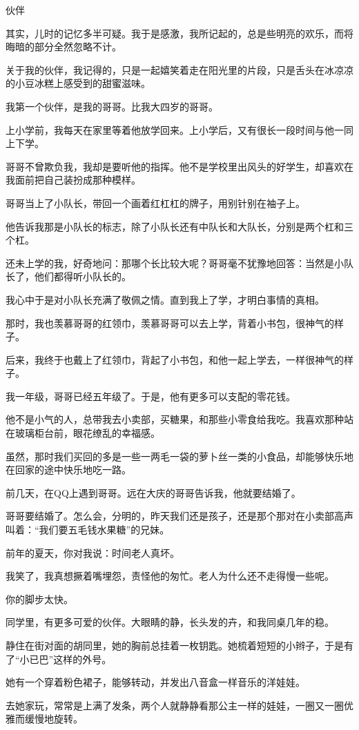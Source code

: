 \documentclass[12pt,a4paper]{article}
\newcommand{\subpart}[1]{
	\begingroup \par
	\vspace{1ex} \centering #1
	\par \endgroup
}
\begin{document}
		\subpart{伙伴}

		其实，儿时的记忆多半可疑。我于是感激，我所记起的，总是些明亮的欢乐，而将晦暗的部分全然忽略不计。\par
		关于我的伙伴，我记得的，只是一起嬉笑着走在阳光里的片段，只是舌头在冰凉凉的小豆冰糕上感受到的甜蜜滋味。

		我第一个伙伴，是我的哥哥。比我大四岁的哥哥。\par
		上小学前，我每天在家里等着他放学回来。上小学后，又有很长一段时间与他一同上下学。\par
		哥哥不曾欺负我，我却是要听他的指挥。他不是学校里出风头的好学生，却喜欢在我面前把自己装扮成那种模样。\par
		哥哥当上了小队长，带回一个画着红杠杠的牌子，用别针别在袖子上。\par
		他告诉我那是小队长的标志，除了小队长还有中队长和大队长，分别是两个杠和三个杠。\par
		还未上学的我，好奇地问：那哪个长比较大呢？哥哥毫不犹豫地回答：当然是小队长了，他们都得听小队长的。\par
		我心中于是对小队长充满了敬佩之情。直到我上了学，才明白事情的真相。

		那时，我也羡慕哥哥的红领巾，羡慕哥哥可以去上学，背着小书包，很神气的样子。\par
		后来，我终于也戴上了红领巾，背起了小书包，和他一起上学去，一样很神气的样子。

		我一年级，哥哥已经五年级了。于是，他有更多可以支配的零花钱。\par
		他不是小气的人，总带我去小卖部，买糖果，和那些小零食给我吃。我喜欢那种站在玻璃柜台前，眼花缭乱的幸福感。\par
		虽然，那时我们买回的多是一些一两毛一袋的萝卜丝一类的小食品，却能够快乐地在回家的途中快乐地吃一路。

		前几天，在QQ上遇到哥哥。远在大庆的哥哥告诉我，他就要结婚了。\par
		哥哥要结婚了。怎么会，分明的，昨天我们还是孩子，还是那个那对在小卖部高声叫着：“我们要五毛钱水果糖”的兄妹。\par
		前年的夏天，你对我说：时间老人真坏。\par
		我笑了，我真想撅着嘴埋怨，责怪他的匆忙。老人为什么还不走得慢一些呢。\par
		你的脚步太快。

		同学里，有更多可爱的伙伴。大眼睛的静，长头发的卉，和我同桌几年的稳。

		静住在街对面的胡同里，她的胸前总挂着一枚钥匙。她梳着短短的小辫子，于是有了“小已巴”这样的外号。\par
		她有一个穿着粉色裙子，能够转动，并发出八音盒一样音乐的洋娃娃。\par
		去她家玩，常常是上满了发条，两个人就静静看那公主一样的娃娃，一圈又一圈优雅而缓慢地旋转。
\end{document}
